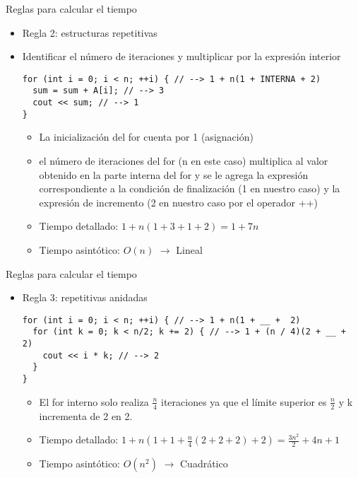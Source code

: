 \documentclass[aspectratio=169]{beamer}
\begin{document}
\begin{frame}[fragile]{Reglas para calcular el tiempo}
  \begin{itemize}
    \item Regla 2: estructuras repetitivas
    \item Identificar el número de iteraciones y multiplicar por la expresión interior
    \begin{lstlisting}
for (int i = 0; i < n; ++i) { // --> 1 + n(1 + INTERNA + 2)
  sum = sum + A[i]; // --> 3
  cout << sum; // --> 1
}
    \end{lstlisting}
    \begin{itemize}
      \item La inicialización del for cuenta por 1 (asignación)
      \item el número de iteraciones del for (n en este caso) multiplica al valor obtenido en la parte interna del for y se le agrega la expresión correspondiente a la condición de finalización (1 en nuestro caso) y la expresión de incremento (2 en nuestro caso por el operador ++)
      \item Tiempo detallado: $1 + n(1 + 3 + 1 + 2) = 1 + 7n$
      \item Tiempo asintótico: $O(n)$ $\longrightarrow$ Lineal
    \end{itemize}
  \end{itemize}
\end{frame}


\begin{frame}[fragile]{Reglas para calcular el tiempo}
  \begin{itemize}
    \item Regla 3: repetitivas anidadas
    \begin{lstlisting}
for (int i = 0; i < n; ++i) { // --> 1 + n(1 + __ +  2)
  for (int k = 0; k < n/2; k += 2) { // --> 1 + (n / 4)(2 + __ +  2)
    cout << i * k; // --> 2
  }
}
    \end{lstlisting}
    \begin{itemize}
      \item El for interno solo realiza $\frac{n}{4}$ iteraciones ya que el límite superior es $\frac{n}{2}$ y k incrementa de 2 en 2.
      \item Tiempo detallado: $1 + n(1 + 1 + \frac{n}{4}(2 + 2 + 2) + 2) = \frac{3n^2}{2} + 4n + 1$
      \item Tiempo asintótico: $O(n^2)$ $\longrightarrow$ Cuadrático
    \end{itemize}
  \end{itemize}
\end{frame}
\end{document}
